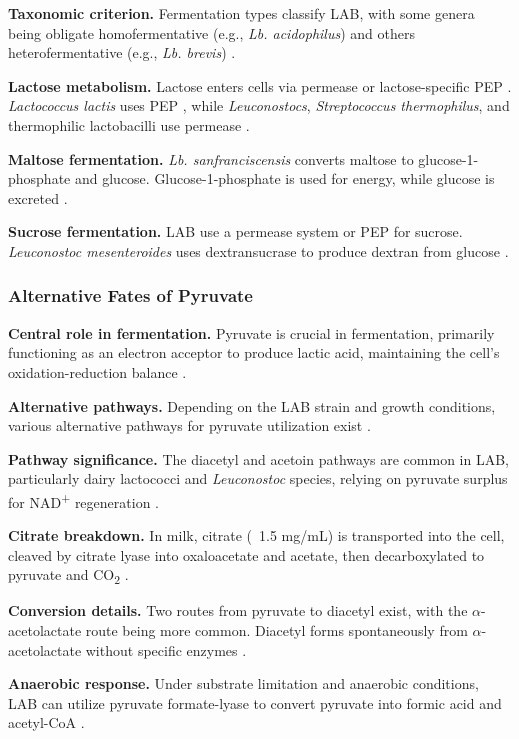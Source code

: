 \textbf{Taxonomic criterion.} Fermentation types classify LAB, with some genera being obligate homofermentative (e.g., \textit{Lb. acidophilus}) and others heterofermentative (e.g., \textit{Lb. brevis}) \cite*{L3-LAB}.

\textbf{Lactose metabolism.} Lactose enters cells via permease or lactose-specific PEP
. \textit{Lactococcus lactis} uses PEP
, while \textit{Leuconostocs}, \textit{Streptococcus thermophilus}, and thermophilic lactobacilli use permease \cite*{L3-LAB}.

\textbf{Maltose fermentation.} \textit{Lb. sanfranciscensis} converts maltose to glucose-1-phosphate and glucose. Glucose-1-phosphate is used for energy, while glucose is excreted \cite*{L3-LAB}.

\textbf{Sucrose fermentation.} LAB use a permease system or PEP
for sucrose. \textit{Leuconostoc mesenteroides} uses dextransucrase to produce dextran from glucose \cite*{L3-LAB}.

\subsubsection{Alternative Fates of Pyruvate}
\textbf{Central role in fermentation.} Pyruvate is crucial in fermentation, primarily functioning as an electron acceptor to produce lactic acid, maintaining the cell's oxidation-reduction balance \cite*{L3-LAB}.

\textbf{Alternative pathways.} Depending on the LAB strain and growth conditions, various alternative pathways for pyruvate utilization exist \cite*{L3-LAB}.

\textbf{Pathway significance.} The diacetyl and acetoin pathways are common in LAB, particularly dairy lactococci and \textit{Leuconostoc} species, relying on pyruvate surplus for NAD\textsuperscript{+} regeneration \cite*{L3-LAB}.

\textbf{Citrate breakdown.} In milk, citrate (~1.5 mg/mL) is transported into the cell, cleaved by citrate lyase into oxaloacetate and acetate, then decarboxylated to pyruvate and CO\textsubscript{2} \cite*{L3-LAB}.

\textbf{Conversion details.} Two routes from pyruvate to diacetyl exist, with the $\alpha$-acetolactate route being more common. Diacetyl forms spontaneously from $\alpha$-acetolactate without specific enzymes \cite*{L3-LAB}.

\textbf{Anaerobic response.} Under substrate limitation and anaerobic conditions, LAB can utilize pyruvate formate-lyase to convert pyruvate into formic acid and acetyl-CoA \cite*{L3-LAB}.

